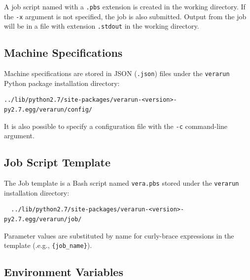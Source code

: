 A job script named with a \texttt{.pbs} extension is created in the working directory.
If the \texttt{-x} argument is not specified, the job is also submitted.  Output from
the job will be in a file with extension \texttt{.stdout} in the working directory.

\subsection{Machine Specifications}

Machine specifications are stored in JSON (\texttt{.json}) files under the \texttt{verarun}
Python package installation directory:

\begin{Verbatim}
../lib/python2.7/site-packages/verarun-<version>-py2.7.egg/verarun/config/
\end{Verbatim}

It is also possible to specify a configuration file with the \texttt{-c} command-line
argument.

\subsection{Job Script Template}

The Job template is a Bash script named \texttt{vera.pbs} stored under the \texttt{verarun}
installation directory:

\begin{Verbatim}
  ../lib/python2.7/site-packages/verarun-<version>-py2.7.egg/verarun/job/
\end{Verbatim}

Parameter values are substituted by name for curly-brace expressions in the
template (.e.g., \texttt{\{job\_name\}}).

\subsection{Environment Variables}


